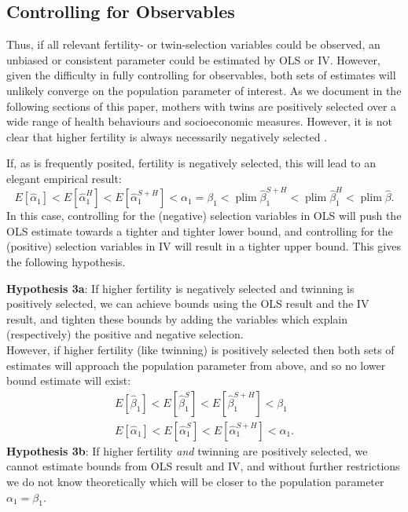 \documentclass[subeqn]{article}
\DeclareMathOperator{\plim}{plim}
\begin{document}
\begin{spacing}{1.4}
\subsection{Controlling for Observables}
Thus, if all relevant fertility- or twin-selection variables could be observed,
an unbiased or consistent parameter could be estimated by OLS or IV.  However,
given the difficulty in fully controlling for observables, both sets of estimates
will unlikely converge on the population parameter of interest. As we document
in the following sections of this paper, mothers with twins are positively
selected over a wide range of health behaviours and socioeconomic measures.
However, it is not clear that higher fertility is always necessarily negatively
selected \citep{Fortetal2016,Myrskylaetal2009}.

If, as is frequently posited, fertility is negatively selected, this will lead
to an elegant empirical result:
\[
E[\hat\alpha_1] < E[\hat\alpha_1^{H}] < E[\hat\alpha_1^{S+H}] < \alpha_1 =  \beta_1 < \plim\hat\beta_1^{S+H} < \plim\hat\beta_1^{H}<\plim\hat\beta.
\]
In this case, controlling for the (negative) selection variables in OLS will
push the OLS estimate towards a tighter and tighter lower bound, and controlling
for the (positive) selection variables in IV will result in a tighter upper bound.
This gives the following hypothesis.

\noindent \textbf{Hypothesis 3a}: If higher fertility is negatively selected and twinning is positively selected, we can achieve bounds using the OLS result and the IV result, and tighten these bounds by adding the variables which explain (respectively) the positive and negative selection.
\\
However, if higher fertility (like twinning) is positively selected then both
sets of estimates will approach the population parameter from above, and so
no lower bound estimate will exist:
\begin{eqnarray}
  E[\hat\beta_1] < E[\hat\beta_1^{S}] < E[\hat\beta_1^{S+H}] < \beta_1  \nonumber \\
  E[\hat\alpha_1] < E[\hat\alpha_1^{S}] < E[\hat\alpha_1^{S+H}] < \alpha_1. \nonumber
\end{eqnarray}
\noindent \textbf{Hypothesis 3b}: If higher fertility \emph{and} twinning are positively selected, we cannot estimate bounds from OLS result and IV, and without further restrictions we do not know theoretically which will be closer to the population parameter $\alpha_1=\beta_1$.


\end{spacing}
\end{document}
